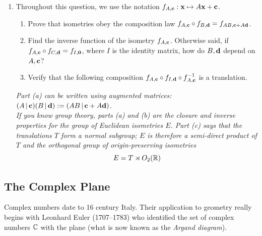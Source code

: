 \begin{exercises}
\begin{enumerate}
	  
	  \item\label{exs:kleingroup} Throughout this question, we use the notation $f_{A,{\mathbf{c}}}:{\mathbf{x}}\mapsto A{\mathbf{x}}+{\mathbf{c}}$.
	  \begin{enumerate}
	    \item Prove that isometries obey the composition law $f_{A,{\mathbf{c}}}\circ f_{B,{\mathbf{d}}}=f_{AB,{\mathbf{c}}+A{\mathbf{d}}}$.
	    \item Find the inverse function of the isometry $f_{A,{\mathbf{c}}}$. Otherwise said, if $f_{A,{\mathbf{c}}}\circ f_{C,{\mathbf{d}}}=f_{I,{\mathbf{0}}}$, where $I$ is the identity matrix, how do $B,{\mathbf{d}}$ depend on $A,{\mathbf{c}}$?
	    \item Verify that the following composition $f_{A,{\mathbf{c}}}\circ f_{I,{\mathbf{d}}}\circ f_{A,{\mathbf{c}}}^{-1}$ is a translation.
	  \end{enumerate}
		\emph{Part (a) can be written using augmented matrices: $(A\,|\,{\mathbf{c}})(B\,|\,{\mathbf{d}}):=(AB\,|\,{\mathbf{c}}+A{\mathbf{d}})$.\\
		If you know group theory, parts (a) and (b) are the closure and inverse properties for the group of Euclidean isometries $E$. Part (c) says that the translations $T$ form a normal subgroup; $E$ is therefore a semi-direct product of $T$ and the orthogonal group of origin-preserving isometries
		\[
			E=T\rtimes O_2(\mathbb{R})
		\]
		}
	
	\end{enumerate}
\end{exercises}

\clearpage



\subsection{The Complex Plane}\label{sec:complexplane}

Complex numbers date to 16\th{} century Italy. Their application to geometry really begins with Leonhard Euler (1707--1783) who identified the set of complex numbers $\mathbb{C}$ with the plane (what is now known as the \emph{Argand diagram}).

